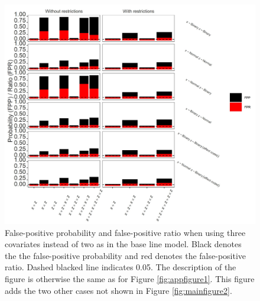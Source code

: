 \begin{figure}[ht!]
\includegraphics[width=1\textwidth]{R/Analysis/Result/Figures/Figure1CSI.jpeg}
\centering
\caption{False-positive probability and false-positive ratio when using three covariates instead of two as in the base line model. Black denotes the the false-positive probability and red denotes the false-positive ratio. Dashed blacked line indicates 0.05. The description of the figure is otherwise the same as for Figure \ref{fig:appfigure1}. This figure adds the two other cases not shown in Figure \ref{fig:mainfigure2}.
}
\label{fig:appfigure5}
\end{figure}

